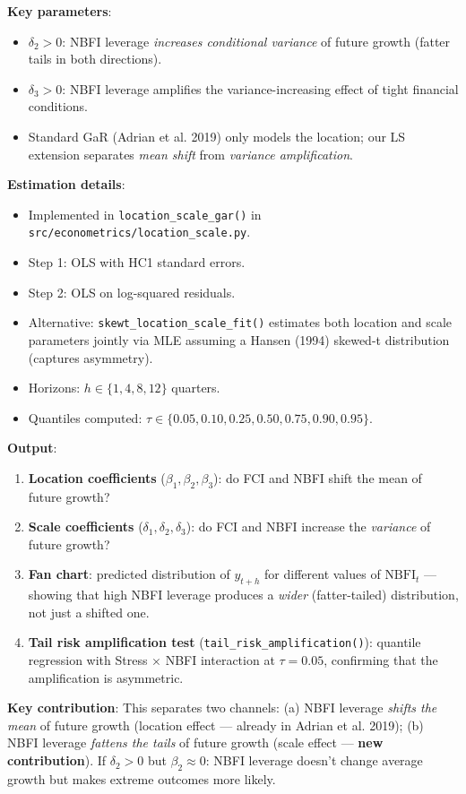 \documentclass[11pt,a4paper]{article}
\begin{document}
\textbf{Key parameters}:
\begin{itemize}
\item $\delta_2 > 0$: NBFI leverage \textit{increases conditional variance} of future growth (fatter tails in both directions).
\item $\delta_3 > 0$: NBFI leverage amplifies the variance-increasing effect of tight financial conditions.
\item Standard GaR (Adrian et al. 2019) only models the location; our LS extension separates \textit{mean shift} from \textit{variance amplification}.

\end{itemize}
\textbf{Estimation details}:
\begin{itemize}
\item Implemented in \texttt{location\_scale\_gar()} in \texttt{src/econometrics/location\_scale.py}.
\item Step 1: OLS with HC1 standard errors.
\item Step 2: OLS on log-squared residuals.
\item Alternative: \texttt{skewt\_location\_scale\_fit()} estimates both location and scale parameters jointly via MLE assuming a Hansen (1994) skewed-t distribution (captures asymmetry).
\item Horizons: $h \in \{1, 4, 8, 12\}$ quarters.
\item Quantiles computed: $\tau \in \{0.05, 0.10, 0.25, 0.50, 0.75, 0.90, 0.95\}$.

\end{itemize}
\textbf{Output}:
\begin{enumerate}
\item \textbf{Location coefficients} ($\beta_1, \beta_2, \beta_3$): do FCI and NBFI shift the mean of future growth?
\item \textbf{Scale coefficients} ($\delta_1, \delta_2, \delta_3$): do FCI and NBFI increase the \textit{variance} of future growth?
\item \textbf{Fan chart}: predicted distribution of $y_{t+h}$ for different values of $\text{NBFI}_t$ --- showing that high NBFI leverage produces a \textit{wider} (fatter-tailed) distribution, not just a shifted one.
\item \textbf{Tail risk amplification test} (\texttt{tail\_risk\_amplification()}): quantile regression with Stress $\times$ NBFI interaction at $\tau = 0.05$, confirming that the amplification is asymmetric.

\end{enumerate}
\textbf{Key contribution}: This separates two channels: (a) NBFI leverage \textit{shifts the mean} of future growth (location effect --- already in Adrian et al. 2019); (b) NBFI leverage \textit{fattens the tails} of future growth (scale effect --- \textbf{new contribution}). If $\delta_2 > 0$ but $\beta_2 \approx 0$: NBFI leverage doesn't change average growth but makes extreme outcomes more likely.
\end{document}
